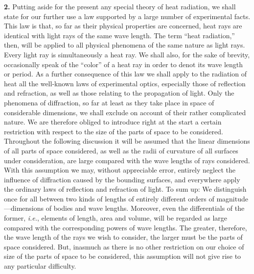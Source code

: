 \documentclass[12pt,oneside]{book}
\begin{document}
\textbf{2.} Putting aside for the present any special theory of heat radiation, we shall state for our further use a law supported by a large number of experimental facts. This law is that, so far as their physical properties are concerned, heat rays are identical with light rays of the same wave length. The term ``heat radiation,'' then, will be applied to all physical phenomena of the same nature as light rays. Every light ray is simultaneously a heat ray. We shall also, for the sake of brevity, occasionally speak of the ``color'' of a heat ray in order to denot its wave length or period. As a further consequence of this law we shall apply to the radiation of heat all the well-known laws of experimental optics, especially those of reflection and refraction, as well as those relating to the propagation of light. Only the phenomena of diffraction, so far at least as they take place in space of considerable dimensions, we shall exclude on account of their rather complicated nature. We are therefore obliged to introduce right at the start a certain restriction with respect to the size of the parts of space to be considered. Throughout the following discussion it will be assumed that the linear dimensions of all parts of space considered, as well as the radii of curvature of all surfaces under consideration, are large compared with the wave lengths of rays considered. With this assumption we may, without appreciable error, entirely neglect the influence of diffraction caused by the bounding surfaces, and everywhere apply the ordinary laws of reflection and refraction of light. To sum up: We distinguish once for all between two kinds of lengths of entirely different orders of magnitude---dimensions of bodies and wave lengths. Moreover, even the differentials of the former, \textit{i.e.}, elements of length, area and volume, will be regarded as large compared with the corresponding powers of wave lengths. The greater, therefore, the wave length of the rays we wish to consider, the larger must be the parts of space considered. But, inasmuch as there is no other restriction on our choice of size of the parts of space to be considered, this assumption will not give rise to any particular difficulty. \par 
\end{document}

